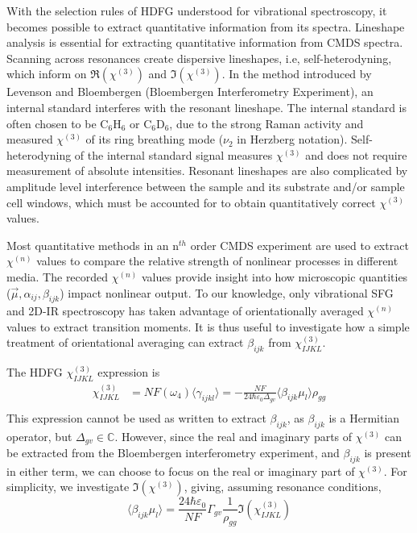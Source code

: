 \documentclass[aip, jcp, reprint, onecolumn]{revtex4-2}
\begin{document}
With the selection rules of HDFG understood for vibrational spectroscopy, it becomes possible to extract quantitative information from its spectra.
Lineshape analysis is essential for extracting quantitative information from CMDS spectra.
Scanning across resonances create dispersive lineshapes, i.e, self-heterodyning, which inform on $\Re(\chi^{(3)})$ and $\Im(\chi^{(3)})$.\cite{Levenson1974_1, Levenson1974_2}
In the method introduced by Levenson and Bloembergen (Bloembergen Interferometry Experiment), an internal standard interferes with the resonant lineshape.
The internal standard is often chosen to be C$_6$H$_6$ or C$_6$D$_6$, due to the strong Raman activity and measured $\chi^{(3)}$ of its ring breathing mode ($\nu_2$ in Herzberg notation). \cite{Levenson1974_2, RN351, RN345}
Self-heterodyning of the internal standard signal measures $\chi^{(3)}$ and does not require measurement of absolute intensities. 
Resonant lineshapes are also complicated by amplitude level interference between the sample and its substrate and/or sample cell windows, which must be accounted for to obtain quantitatively correct $\chi^{(3)}$ values. \cite{RN362, RN418}

Most quantitative methods in an n$^{th}$ order CMDS experiment are used to extract $\chi^{(n)}$ values to compare the relative strength of nonlinear processes in different media. \cite{Zhu87, RN351, RN345}
The recorded $\chi^{(n)}$ values provide insight into how microscopic quantities ($\vec{\mu}, \alpha_{ij}, \beta_{ijk}$) impact nonlinear output.
To our knowledge, only vibrational SFG and 2D-IR spectroscopy has taken advantage of orientationally averaged $\chi^{(n)}$ values to extract transition moments. \cite{Shen90, Moilanen2009, RN245}
It is thus useful to investigate how a simple treatment of orientational averaging can extract $\beta_{ijk}$ from $\chi^{(3)}_{IJKL}$.

The HDFG $\chi^{(3)}_{IJKL}$ expression is
\begin{equation}\label{chi3}
\begin{split}
		\chi^{(3)}_{IJKL} &= NF(\omega_4) \langle \gamma_{ijkl} \rangle = -\frac{NF}{24 \hbar \varepsilon_0 \Delta_{gv}} \langle \beta_{ijk} \mu_l \rangle \rho_{gg}\\
\end{split}
\end{equation}
This expression cannot be used as written to extract $\beta_{ijk}$, as $\beta_{ijk}$ is a Hermitian operator, but $\Delta_{gv} \in \mathbb{C}$. 
However, since the real and imaginary parts of $\chi^{(3)}$ can be extracted from the Bloembergen interferometry experiment, and $\beta_{ijk}$ is present in either term, we can choose to focus on the real or imaginary part of $\chi^{(3)}$.
For simplicity, we investigate $\Im(\chi^{(3)})$, giving, assuming resonance conditions, 
\begin{equation}
	\langle \beta_{ijk} \mu_{l} \rangle = \frac{24 \hbar \varepsilon_0}{NF} \Gamma_{gv} \frac{1}{\rho_{gg}} \Im(\chi^{(3)}_{IJKL})
\end{equation}
\end{document}
